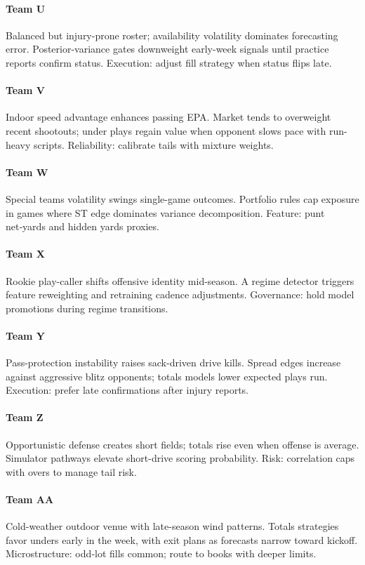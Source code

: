 \documentclass[12pt]{report}  %
\numberwithin{equation}{section}
\theoremstyle{plain}
\theoremstyle{definition}
\theoremstyle{remark}
\begin{document}
\paragraph{Team U} Balanced but injury-prone roster; availability volatility dominates forecasting error. Posterior-variance gates downweight early-week signals until practice reports confirm status. Execution: adjust fill strategy when status flips late.

\paragraph{Team V} Indoor speed advantage enhances passing EPA. Market tends to overweight recent shootouts; under plays regain value when opponent slows pace with run-heavy scripts. Reliability: calibrate tails with mixture weights.

\paragraph{Team W} Special teams volatility swings single-game outcomes. Portfolio rules cap exposure in games where ST edge dominates variance decomposition. Feature: punt net‑yards and hidden yards proxies.

\paragraph{Team X} Rookie play-caller shifts offensive identity mid-season. A regime detector triggers feature reweighting and retraining cadence adjustments. Governance: hold model promotions during regime transitions.

\paragraph{Team Y} Pass-protection instability raises sack-driven drive kills. Spread edges increase against aggressive blitz opponents; totals models lower expected plays run. Execution: prefer late confirmations after injury reports.

\paragraph{Team Z} Opportunistic defense creates short fields; totals rise even when offense is average. Simulator pathways elevate short-drive scoring probability. Risk: correlation caps with overs to manage tail risk.

\paragraph{Team AA} Cold-weather outdoor venue with late-season wind patterns. Totals strategies favor unders early in the week, with exit plans as forecasts narrow toward kickoff. Microstructure: odd‑lot fills common; route to books with deeper limits.
\end{document}
